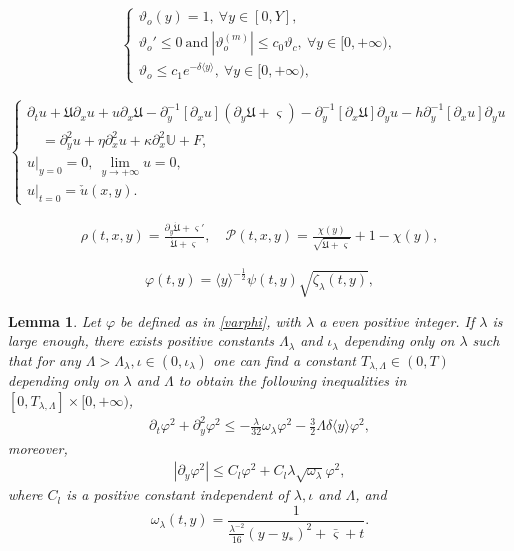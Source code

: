 \documentclass[10pt,a4paper]{amsart}
\newtheorem{lemma}{Lemma}
\newcommand\y{{{\langle y \rangle}}}
\begin{document}
\begin{align}\label{theta}
\begin{cases}
\vartheta_{o}(y)=1,~ \forall y\in[0,Y],\\
\vartheta_{o}'\leq 0~\text{and}~|\vartheta_{o}^{(m)}|\leq c_{0}\vartheta_{c},~ \forall y\in [0,+\infty),\\
\vartheta_{o}\leq c_{1}e^{-\delta\y},~ \forall y\in [0,+\infty),
\end{cases}
\end{align}

\begin{equation}\label{app}
\begin{cases}
\partial_{t}u
+\mathfrak{U}\partial_{x}u+u\partial_{x}\mathfrak{U}
-\partial_{y}^{-1}[\partial_{x}u](\partial_{y}\mathfrak{U}+\varsigma)
-\partial_{y}^{-1}[\partial_{x}\mathfrak{U}]\partial_{y}u
-h\partial_{y}^{-1}[\partial_{x}u]\partial_{y}u\\
\quad
=\partial_{y}^{2}u+\eta\partial_{x}^{2}u+\kappa\partial_{x}^{2}\mathbb{U}+F,\\
u|_{y=0}=0,~\lim\limits_{y\to+\infty} u=0,\\
u|_{t=0}=\check{u}(x,y).
\end{cases}
\end{equation}

\begin{align}\label{rhoPd}
\rho(t,x,y)=\frac{\partial_{y}\dot{\mathfrak{U}}+\varsigma'}{\dot{\mathfrak{U}}+\varsigma}, \quad
\mathcal{P}(t,x,y)=\frac{\chi(y)}{\sqrt{\dot{\mathfrak{U}}+\varsigma}}+1-\chi(y),
\end{align}

\begin{equation}\label{varphi}
\varphi(t,y)=\y^{-\frac{1}{2}}\psi(t,y)\sqrt{\zeta_{\lambda}(t,y)},
\end{equation}

\begin{lemma}\label{weighte}
Let $\varphi$ be defined as in \eqref{varphi}, with $\lambda$ a even positive integer. If $\lambda$ is large enough, there exists positive constants $\Lambda_{\lambda}$ and $\iota_{\lambda}$ depending only on $\lambda$ such that for any
$\Lambda>\Lambda_{\lambda}, \iota\in(0,\iota_{\lambda})$ one can find a constant $T_{\lambda,\Lambda}\in(0,T)$ depending only on $\lambda$ and $\Lambda$ to obtain the following inequalities in $[0,T_{\lambda,\Lambda}]\times[0,+\infty)$,
\begin{align}\label{We}
\partial_{t}\varphi^{2}+\partial_{y}^{2}\varphi^{2}
\leq -\frac{\lambda}{32}\omega_{\lambda}\varphi^{2}
     -\frac{3}{2}\Lambda\delta\y\varphi^{2},
\end{align}
moreover,
\begin{align}\label{varphiy}
|\partial_{y}\varphi^{2}|
\leq C_{l}\varphi^{2}+C_{l}\lambda\sqrt{\omega_{\lambda}}\varphi^{2},
\end{align}
where $C_{l}$ is a positive constant independent of $\lambda,\iota$ and $\Lambda$, and
$$\omega_{\lambda}(t,y)=\frac{1}{\frac{\lambda^{-2}}{16}(y-y_{*})^{2}+\bar{\varsigma}+t}.$$
\end{lemma}
\end{document}
